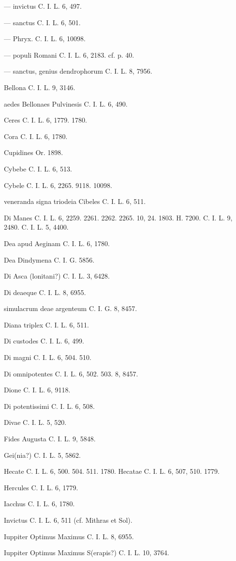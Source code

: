 \documentclass[a4paper, 11pt, oneside, polutonikogreek, german]{article}
\begin{document}
--- invictus C. I. L. 6, 497.

--- sanctus C. I. L. 6, 501.

--- Phryx. C. I. L. 6, 10098.

--- populi Romani C. I. L. 6, 2183. cf. p. 40.

--- sanctus, genius dendrophorum C. I. L. 8, 7956.

Bellona C. I. L. 9, 3146.

aedes Bellonaes Pulvinesis C. I. L. 6, 490.

Ceres C. I. L. 6, 1779. 1780.

Cora C. I. L. 6, 1780.

Cupidines Or. 1898.

Cybebe C. I. L. 6, 513.

Cybele C. I. L. 6, 2265. 9118. 10098.

veneranda signa triodeia Cibeles C. I. L. 6, 511.

Di Manes C. I. L. 6, 2259. 2261. 2262. 2265. 10, 24. 1803. H. 7200. C. I. L. 9, 2480. C. I. L. 5, 4400.

Dea apud Aeginam C. I. L. 6, 1780.

Dea Dindymena C. I. G. 5856.

Di Asca (lonitani?) C. I. L. 3, 6428.

Di deaeque C. I. L. 8, 6955.

simulacrum deae argenteum C. I. G. 8, 8457.

Diana triplex C. I. L. 6, 511.

Di custodes C. I. L. 6, 499.

Di magni C. I. L. 6, 504. 510.

Di omnipotentes C. I. L. 6, 502. 503. 8, 8457.

Dione C. I. L. 6, 9118.

Di potentissimi C. I. L. 6, 508.

Divae C. I. L. 5, 520.

Fides Augusta C. I. L. 9, 5848.

Gei(nia?) C. I. L. 5, 5862.

Hecate C. I. L. 6, 500. 504. 511. 1780. Hecatae C. I. L. 6, 507, 510. 1779.

Hercules C. I. L. 6, 1779.

Iacchus C. I. L. 6, 1780.

Invictus C. I. L. 6, 511 (cf. Mithras et Sol).

Iuppiter Optimus Maximus C. I. L. 8, 6955.

Iuppiter Optimus Maximus S(erapis?) C. I. L. 10, 3764.
\end{document}
